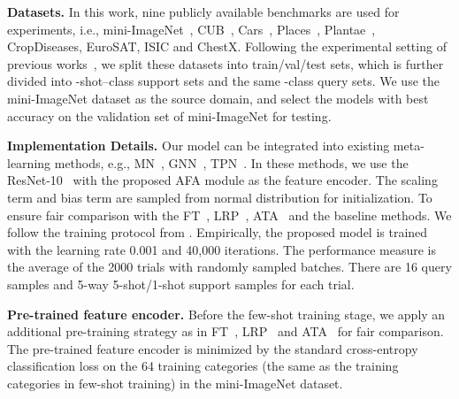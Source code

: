 \documentclass[runningheads]{utils/llncs}
\begin{document}
 
\textbf{Datasets.}
In this work, nine publicly available benchmarks are used for experiments, i.e., mini-ImageNet~\cite{NIPS2016_90e13578}, CUB~\cite{welinder2010caltech}, Cars~\cite{Krause0DF13}, Places~\cite{zhou2017places}, Plantae~\cite{HornASCSSAPB18}, CropDiseases, EuroSAT, ISIC and ChestX. 
Following the experimental setting of previous works~\cite{TsengLH020,WangD21}, we split these datasets into train/val/test sets, which is further divided into -shot--class support sets and the same -class query sets.
We use the mini-ImageNet dataset as the source domain, and select the models with best accuracy on the validation set of mini-ImageNet for testing.

\noindent
{\bf Implementation Details.}
Our model can be integrated into existing meta-learning methods, e.g., MN~\cite{NIPS2016_90e13578}, GNN~\cite{SatorrasE18}, TPN~\cite{LiuLPKYHY19}.
In these methods, we use the ResNet-10~\cite{HeZRS16} with the proposed AFA module as the feature encoder.
The scaling term  and bias term  are sampled from normal distribution for initialization.
To ensure fair comparison with the FT~\cite{TsengLH020}, LRP~\cite{SunLSZCB20}, ATA~\cite{WangD21} and the baseline methods. 
We follow the training protocol from \cite{ChenLKWH19}.
Empirically, the proposed model is trained with the learning rate 0.001 and 40,000 iterations. 
The performance measure is the average of the 2000 trials with randomly sampled batches. 
There are 16 query samples and 5-way 5-shot/1-shot support samples for each trial. 

\noindent
{\bf Pre-trained feature encoder.} Before the few-shot training stage, we apply an additional pre-training strategy as in FT~\cite{TsengLH020}, LRP~\cite{SunLSZCB20} and ATA~\cite{WangD21} for fair comparison.
The pre-trained feature encoder is minimized by the standard cross-entropy classification loss on the 64 training categories (the same as the training categories in few-shot training) in the mini-ImageNet dataset.
\end{document}
